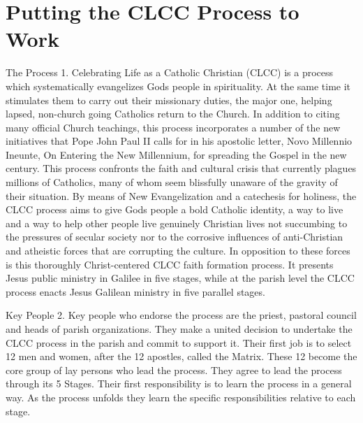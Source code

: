 \documentclass[oneside]{book}
\begin{document}
\chapter{Putting the CLCC Process to Work}

The Process 1. Celebrating Life as a Catholic Christian (CLCC) is a process
which systematically evangelizes Gods people in spirituality. At the same time
it stimulates them to carry out their missionary duties, the major one, helping
lapsed, non-church going Catholics return to the Church. In addition to citing
many official Church teachings, this process incorporates a number of the new
initiatives that Pope John Paul II calls for in his apostolic letter, Novo
Millennio Ineunte, On Entering the New Millennium, for spreading the Gospel in
the new century.  This process confronts the faith and cultural crisis that
currently plagues millions of Catholics, many of whom seem blissfully unaware of
the gravity of their situation.  By means of New Evangelization and a catechesis
for holiness, the CLCC process aims to give Gods people a bold Catholic
identity, a way to live and a way to help other people live genuinely Christian
lives not succumbing to the pressures of secular society nor to the corrosive
influences of anti-Christian and atheistic forces that are corrupting the
culture. In opposition to these forces is this thoroughly Christ-centered CLCC
faith formation process. It presents Jesus public ministry in Galilee in five
stages, while at the parish level the CLCC process enacts Jesus Galilean
ministry in five parallel stages.

Key People 2. Key people who endorse the process are the priest, pastoral
council and heads of parish organizations. They make a united decision to
undertake the CLCC process in the parish and commit to support it.  Their first
job is to select 12 men and women, after the 12 apostles, called the
Matrix. These 12 become the core group of lay persons who lead the process. They
agree to lead the process through its 5 Stages. Their first responsibility is to
learn the process in a general way. As the process unfolds they learn the
specific responsibilities relative to each stage.
\end{document}
